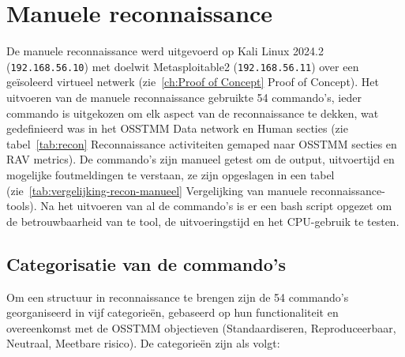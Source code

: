 \section{Manuele reconnaissance}
De manuele reconnaissance werd uitgevoerd op Kali Linux 2024.2 (\texttt{192.168.56.10}) met doelwit Metasploitable2 (\texttt{192.168.56.11}) over een geïsoleerd virtueel netwerk (zie~\ref{ch:Proof of Concept} Proof of Concept).
Het uitvoeren van de manuele reconnaissance gebruikte 54 commando's, ieder commando is uitgekozen om elk aspect van de reconnaissance te dekken, wat gedefinieerd was in het OSSTMM Data network en Human secties (zie tabel~\ref{tab:recon} Reconnaissance activiteiten gemaped naar OSSTMM secties en RAV metrics).
De commando's zijn manueel getest om de output, uitvoertijd en mogelijke foutmeldingen te verstaan, ze zijn opgeslagen in een tabel (zie~\ref{tab:vergelijking-recon-manueel} Vergelijking van manuele reconnaissance-tools).
Na het uitvoeren van al de commando's is er een bash script opgezet om de betrouwbaarheid van te tool, de uitvoeringstijd en het CPU-gebruik te testen.

\subsection{Categorisatie van de commando's}

Om een structuur in reconnaissance te brengen zijn de 54 commando's georganiseerd in vijf categorieën, gebaseerd op hun functionaliteit en overeenkomst met de OSSTMM objectieven (Standaardiseren, Reproduceerbaar, Neutraal, Meetbare risico).
De categorieën zijn als volgt:

